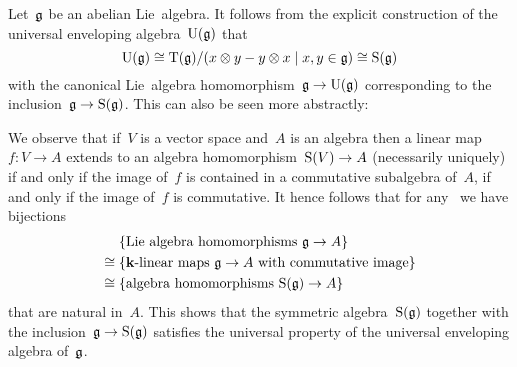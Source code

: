 \begin{examples}
  Let~$\mathfrak{g}$ be an abelian Lie~algebra.
  It follows from the explicit construction of the universal enveloping algebra~$\operatorname{U}(\mathfrak{g})$ that
  \[
    \Univ(\glie)
    \cong
    \Tensor(\glie)/(x \tensor y - y \tensor x \suchthat x, y \in \glie)
    \cong
    \Symm(\glie)
  \]
  with the canonical Lie~algebra homomorphism~$\mathfrak{g} \to \operatorname{U}(\mathfrak{g})$ corresponding to the inclusion~$\mathfrak{g} \to \operatorname{S}(\mathfrak{g})$.
  This can also be seen more abstractly:
  
  We observe that if~$V$ is a vector space and~$A$ is an algebra then a linear map~$f \colon V \to A$ extends to an algebra homomorphism~$\operatorname{S}(V) \to A$ (necessarily uniquely) if and only if the image of~$f$ is contained in a commutative subalgebra of~$A$, if and only if the image of~$f$ is commutative.
  It hence follows that for any~{\algebra{$\kf$}} we have bijections
  \begin{align*}
    {}&
    \{ \text{Lie~algebra homomorphisms~$\glie \to A$} \}
    \\
    \cong{}&
    \{ \text{{\linear{$\kf$}} maps~$\glie \to A$ with commutative image} \}
    \\
    \cong{}&
    \{ \text{algebra homomorphisms~$\Symm(\glie) \to A$} \}
  \end{align*}
  that are natural in~$A$.
  This shows that the symmetric algebra~$\operatorname{S}(\mathfrak{g})$ together with the inclusion~$\mathfrak{g} \to \operatorname{S}(\mathfrak{g})$ satisfies the universal property of the universal enveloping algebra of~$\mathfrak{g}$.
\end{examples}


